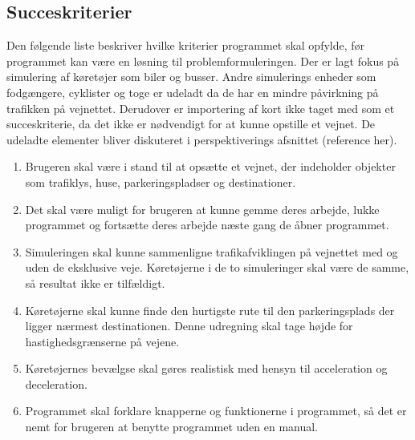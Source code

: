 \subsection{Succeskriterier}\label{Succeskriterier}
Den følgende liste beskriver hvilke kriterier programmet skal opfylde, før programmet kan være en løsning til problemformuleringen. Der er lagt fokus på simulering af køretøjer som biler og busser. Andre simulerings enheder som fodgængere, cyklister og toge er udeladt da de har en mindre påvirkning på trafikken på vejnettet. Derudover er importering af kort ikke taget med som et succeskriterie, da det ikke er nødvendigt for at kunne opstille et vejnet. De udeladte elementer bliver diskuteret i perspektiverings afsnittet (reference her).

\begin{enumerate}
\item Brugeren skal være i stand til at opsætte et vejnet, der indeholder objekter som trafiklys, huse, parkeringspladser og destinationer.
\item Det skal være muligt for brugeren at kunne gemme deres arbejde, lukke programmet og fortsætte deres arbejde næste gang de åbner programmet.
\item Simuleringen skal kunne sammenligne trafikafviklingen på vejnettet med og uden de eksklusive veje. Køretøjerne i de to simuleringer skal være de samme, så resultat ikke er tilfældigt.
\item Køretøjerne skal kunne finde den hurtigste rute til den parkeringsplads der ligger nærmest destinationen. Denne udregning skal tage højde for hastighedsgrænserne på vejene.
\item Køretøjernes bevælgse skal gøres realistisk med hensyn til acceleration og deceleration.
\item Programmet skal forklare knapperne og funktionerne i programmet, så det er nemt for brugeren at benytte programmet uden en manual.
\end{enumerate}
